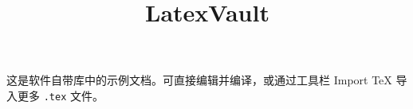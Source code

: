 \documentclass{article}
\title{LatexVault}
\author{}
\date{}
\begin{document}
\maketitle

这是软件自带库中的示例文档。可直接编辑并编译，或通过工具栏 Import TeX 导入更多 \texttt{.tex} 文件。
\end{document}
